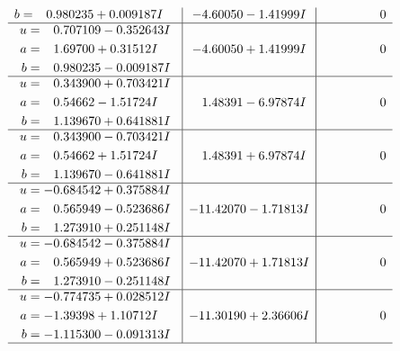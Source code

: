 \documentclass[1p]{elsarticle_modified}
\theoremstyle{definition}
\begin{document}
$$\begin{array}{c|c|c}
\begin{aligned}
b &= \phantom{-}0.980235 + 0.009187 I\end{aligned}
 & -4.60050 - 1.41999 I & \phantom{-0.000000 } 0 \\ \hline\begin{aligned}
u &= \phantom{-}0.707109 - 0.352643 I \\
a &= \phantom{-}1.69700 + 0.31512 I \\
b &= \phantom{-}0.980235 - 0.009187 I\end{aligned}
 & -4.60050 + 1.41999 I & \phantom{-0.000000 } 0 \\ \hline\begin{aligned}
u &= \phantom{-}0.343900 + 0.703421 I \\
a &= \phantom{-}0.54662 - 1.51724 I \\
b &= \phantom{-}1.139670 + 0.641881 I\end{aligned}
 & \phantom{-}1.48391 - 6.97874 I & \phantom{-0.000000 } 0 \\ \hline\begin{aligned}
u &= \phantom{-}0.343900 - 0.703421 I \\
a &= \phantom{-}0.54662 + 1.51724 I \\
b &= \phantom{-}1.139670 - 0.641881 I\end{aligned}
 & \phantom{-}1.48391 + 6.97874 I & \phantom{-0.000000 } 0 \\ \hline\begin{aligned}
u &= -0.684542 + 0.375884 I \\
a &= \phantom{-}0.565949 - 0.523686 I \\
b &= \phantom{-}1.273910 + 0.251148 I\end{aligned}
 & -11.42070 - 1.71813 I & \phantom{-0.000000 } 0 \\ \hline\begin{aligned}
u &= -0.684542 - 0.375884 I \\
a &= \phantom{-}0.565949 + 0.523686 I \\
b &= \phantom{-}1.273910 - 0.251148 I\end{aligned}
 & -11.42070 + 1.71813 I & \phantom{-0.000000 } 0 \\ \hline\begin{aligned}
u &= -0.774735 + 0.028512 I \\
a &= -1.39398 + 1.10712 I \\
b &= -1.115300 - 0.091313 I\end{aligned}
 & -11.30190 + 2.36606 I & \phantom{-0.000000 } 0\\
 \hline 
 \end{array}$$\newpage$$\begin{array}{c|c|c}  

\end{array}$$
\end{document}
